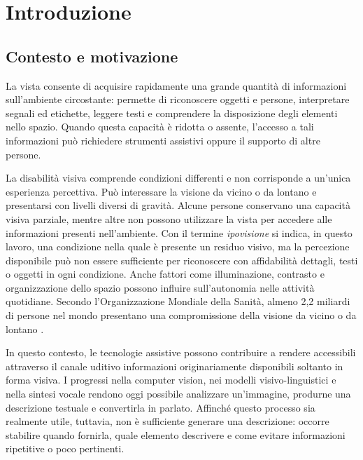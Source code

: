 \chapter{Introduzione}
\label{cap:introduzione}

\section{Contesto e motivazione}

La vista consente di acquisire rapidamente una grande quantità di informazioni
sull'ambiente circostante: permette di riconoscere oggetti e persone,
interpretare segnali ed etichette, leggere testi e comprendere la disposizione
degli elementi nello spazio. Quando questa capacità è ridotta o assente,
l'accesso a tali informazioni può richiedere strumenti assistivi oppure il
supporto di altre persone.

La disabilità visiva comprende condizioni differenti e non corrisponde a
un'unica esperienza percettiva. Può interessare la visione da vicino o da
lontano e presentarsi con livelli diversi di gravità. Alcune persone conservano
una capacità visiva parziale, mentre altre non possono utilizzare la vista per
accedere alle informazioni presenti nell'ambiente. Con il termine
\emph{ipovisione} si indica, in questo lavoro, una condizione nella quale è
presente un residuo visivo, ma la percezione disponibile può non essere
sufficiente per riconoscere con affidabilità dettagli, testi o oggetti in ogni
condizione. Anche fattori come illuminazione, contrasto e organizzazione dello
spazio possono influire sull'autonomia nelle attività quotidiane. Secondo
l'Organizzazione Mondiale della Sanità, almeno 2,2 miliardi di persone nel
mondo presentano una compromissione della visione da vicino o da lontano
\cite{who_blindness_vision_impairment_2026}.

In questo contesto, le tecnologie assistive possono contribuire a rendere
accessibili attraverso il canale uditivo informazioni originariamente
disponibili soltanto in forma visiva. I progressi nella computer vision, nei
modelli visivo-linguistici e nella sintesi vocale rendono oggi possibile
analizzare un'immagine, produrne una descrizione testuale e convertirla in
parlato. Affinché questo processo sia realmente utile, tuttavia, non è
sufficiente generare una descrizione: occorre stabilire quando fornirla, quale
elemento descrivere e come evitare informazioni ripetitive o poco pertinenti.


